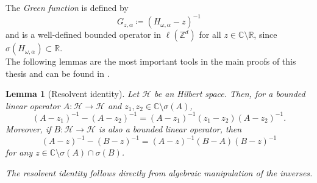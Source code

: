 \documentclass[11pt, a4paper, UKenglish, oneside]{book}
\theoremstyle{plain}
\newtheorem{lemma}[theorem]{Lemma}
\theoremstyle{remark}
\theoremstyle{definition}
\numberwithin{equation}{section}
\numberwithin{theorem}{section}
\begin{document}
The \emph{Green function} is defined by
\begin{equation}
    G_{z,\alpha} \coloneqq (H_{\omega,\alpha} - z)^{-1}
\end{equation}
and is a well-defined bounded operator in $\ell(\mathbb{Z}^d)$ for all $z \in \mathbb{C} \setminus \mathbb{R}$, since $\sigma(H_{\omega,\alpha}) \subset \mathbb{R}$.\\

The following lemmas are the most important tools in the main proofs of this thesis and can be found in \cite{stolz2011}.
\begin{lemma}[Resolvent identity]
    Let $\mathcal{H}$ be an Hilbert space. Then, for a bounded linear operator $A: \mathcal{H} \rightarrow \mathcal{H}$ and $z_1,z_2 \in \mathbb{C} \setminus \sigma(A)$, 
    $$ (A-z_1)^{-1} - (A- z_2)^{-1} = (A-z_1)^{-1}(z_1 - z_2)(A-z_2)^{-1}. $$ 
    Moreover, if $B: \mathcal{H}\rightarrow \mathcal{H}$  is also a bounded linear operator, then
    $$ (A-z)^{-1} - (B- z)^{-1} = (A-z)^{-1}(B-A)(B-z)^{-1} $$ 
    for any $z \in \mathbb{C} \setminus \sigma(A) \cap \sigma(B)$.
\end{lemma}

\textit{The resolvent identity follows directly from  algebraic manipulation of the inverses.}
\end{document}
